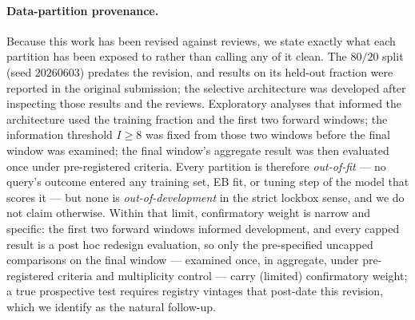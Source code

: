 \documentclass[11pt]{article}
\begin{document}
\paragraph{Data-partition provenance.} Because this work has been revised
against reviews, we state exactly what each partition has been exposed to
rather than calling any of it clean. The $80/20$ split (seed $20260603$)
predates the revision, and results on its held-out fraction were reported in
the original submission; the selective architecture was developed after
inspecting those results and the reviews. Exploratory analyses that informed
the architecture used the training fraction and the first two forward
windows; the information threshold $I \ge 8$ was fixed from those two windows
before the final window was examined; the final window's aggregate result was
then evaluated once under pre-registered criteria. Every partition is
therefore \emph{out-of-fit} --- no query's outcome entered any training set,
EB fit, or tuning step of the model that scores it --- but none is
\emph{out-of-development} in the strict lockbox sense, and we do not claim
otherwise. Within that limit, confirmatory weight is narrow and specific:
the first two forward windows informed development, and every capped
result is a post hoc redesign evaluation, so only the pre-specified
uncapped comparisons on the final window --- examined once, in aggregate,
under pre-registered criteria and multiplicity control --- carry
(limited) confirmatory weight; a true
prospective test requires registry vintages that post-date this revision,
which we identify as the natural follow-up.
\end{document}
